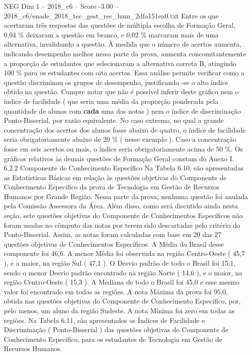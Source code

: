 \begin{textsample}{NEG Dim 1 – 2018\_c6 – Score -3.00 – 2018\_c6/enade\_2018\_tec\_gest\_rec\_hum\_2dfa151ea0.txt}
Entre os que acertaram três respostas das questões de múltipla escolha de Formação Geral, 0,04 \% deixaram a questão em branco, e 0,02 \% marcaram mais de uma alternativa, invalidando a questão.
À medida que o número de acertos aumenta, indicando desempenho melhor nessa parte da prova, aumenta concomitantemente a proporção de estudantes que selecionaram a alternativa correta B, atingindo 100 \% para os estudantes com oito acertos.
Essa análise permite verificar como a questão discriminou os grupos de desempenho, justificando -se o alto índice obtido na questão.
Cumpre notar que não é possível inferir deste gráfico nem o índice de facilidade ( que seria uma média da proporção ponderada pela quantidade de alunos com \textbf{cada} uma das notas ) nem o índice de discriminação Ponto-Bisserial, por razão equivalente.
No caso extremo, no qual a grande concentração dos acertos dos alunos fosse abaixo de quatro, o índice de facilidade seria obrigatoriamente abaixo de 20 \% ( nesse exemplo ).
Caso a concentração fosse em seis acertos ou mais, o índice seria obrigatoriamente acima de 50 \%.
Os gráficos relativos às demais questões de Formação Geral constam do Anexo I. 6.2.2 Componente de Conhecimento Específico Na Tabela 6.10, são apresentadas as Estatísticas Básicas em relação às questões objetivas do Componente de Conhecimento Específico da prova de Tecnologia em Gestão de Recursos Humanos por Grande Região.
Nessa parte da prova, nenhuma questão foi anulada pela Comissão Assessora da Área.
Além disso, como será discutido ainda nesta seção, sete questões objetivas do Componente de Conhecimentos Específicos não foram usadas no cômputo das notas por terem sido descartadas pelo critério do Ponto-Bisserial.
Assim, as notas foram calculadas com base em 20 das 27 questões objetivas de Conhecimentos Específicos.
A Média do Brasil desse componente foi 46,6.
A menor Média foi observada na região Centro-Oeste ( 45,7 ), e a maior, na região Sul ( 47,1 ).
O Desvio padrão de todo o Brasil foi 15,1, sendo o menor Desvio padrão encontrado na região Norte ( 14,6 ), e o maior, na região Centro-Oeste ( 15,3 ).
A Mediana de todo o Brasil foi 45,0 e esse mesmo valor foi encontrado em todas as regiões.
A nota Máxima da prova foi 95,0, obtida nas questões objetivas do Componente de Conhecimento Específico, por, pelo menos, um aluno da região Sudeste.
A nota Mínima foi zero em todas as regiões.
Na Tabela 6.11, são apresentados os Índices de Facilidade e Discriminação ( Ponto-Bisserial ) das questões objetivas do Componente de Conhecimento Específico, para os estudantes de Tecnologia em Gestão de Recursos Humanos.

\end{textsample}
